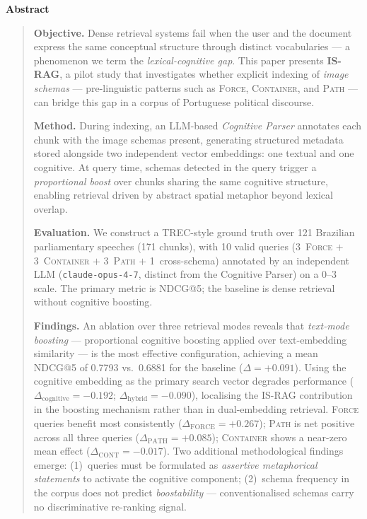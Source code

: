 \documentclass[11pt,a4paper]{article}
\renewenvironment{abstract}{%
  \small\begin{center}{\bfseries Abstract}\end{center}%
  \begin{quote}\small
}{%
  \end{quote}\bigskip
}
\begin{document}
\begin{abstract}
\textbf{Objective.}
Dense retrieval systems fail when the user and the document express
the same conceptual structure through distinct vocabularies — a
phenomenon we term the \emph{lexical-cognitive gap}.
This paper presents \textbf{IS-RAG}, a pilot study that investigates
whether explicit indexing of \emph{image schemas}
\citep{lakoff1980,talmy1988} — pre-linguistic patterns such as
\textsc{Force}, \textsc{Container}, and \textsc{Path} — can bridge
this gap in a corpus of Portuguese political discourse.

\textbf{Method.}
During indexing, an LLM-based \emph{Cognitive Parser} annotates each
chunk with the image schemas present, generating structured metadata
stored alongside two independent vector embeddings: one textual and
one cognitive.
At query time, schemas detected in the query trigger a
\emph{proportional boost} over chunks sharing the same cognitive
structure, enabling retrieval driven by abstract spatial metaphor
beyond lexical overlap.

\textbf{Evaluation.}
We construct a TREC-style ground truth over 121 Brazilian
parliamentary speeches (171 chunks), with 10 valid queries
(3~\textsc{Force} $+$ 3~\textsc{Container} $+$ 3~\textsc{Path} $+$
1~cross-schema) annotated by an independent LLM
(\texttt{claude-opus-4-7}, distinct from the Cognitive Parser) on a
0--3 scale.
The primary metric is NDCG@5; the baseline is dense retrieval without
cognitive boosting.

\textbf{Findings.}
An ablation over three retrieval modes reveals that
\emph{text-mode boosting} — proportional cognitive boosting applied
over text-embedding similarity — is the most effective configuration,
achieving a mean NDCG@5 of 0.7793 vs.\ 0.6881 for the baseline
($\Delta = +0.091$).
Using the cognitive embedding as the primary search vector degrades
performance ($\Delta_\text{cognitive} = -0.192$;
$\Delta_\text{hybrid} = -0.090$), localising the IS-RAG contribution
in the boosting mechanism rather than in dual-embedding retrieval.
\textsc{Force} queries benefit most consistently
($\Delta_\text{FORCE} = +0.267$); \textsc{Path} is net positive
across all three queries ($\Delta_\text{PATH} = +0.085$);
\textsc{Container} shows a near-zero mean effect
($\Delta_\text{CONT} = -0.017$).
Two additional methodological findings emerge: (1)~queries must be
formulated as \emph{assertive metaphorical statements} to activate
the cognitive component; (2)~schema frequency in the corpus does not
predict \emph{boostability} — conventionalised schemas carry no
discriminative re-ranking signal.
\end{abstract}
\end{document}
